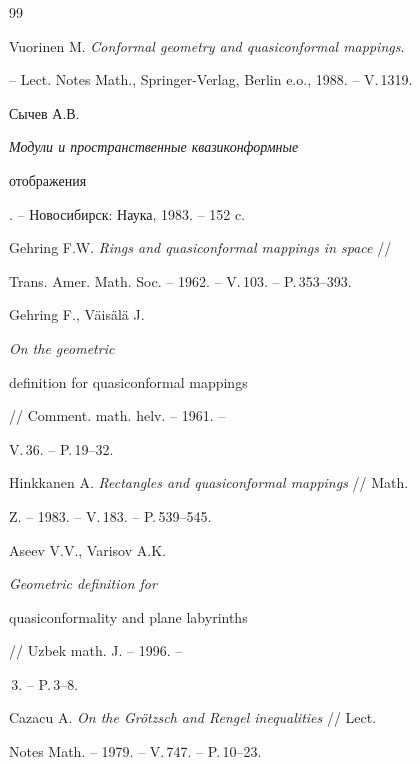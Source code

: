 \begin{thebibliography}{99}




Vuorinen M. {\em Conformal geometry and quasiconformal mappings}. 


-- Lect. Notes Math., Springer-Verlag, Berlin e.o., 1988. -- V.\,1319.







Сычев А.В. {\em Модули и пространственные квазиконформные 


отображения}. -- Новосибирск: Наука, 1983. -- 152 c.







Gehring F.W. {\em Rings and quasiconformal mappings in space} //


Trans. Amer. Math. Soc. -- 1962. -- V.\,103. -- P.\,353--393.







Gehring F., V\"{a}is\"{a}l\"{a} J. {\em On the geometric 


definition for quasiconformal mappings} // Comment. math. helv. -- 1961. --


V.\,36. -- P.\,19--32.







Hinkkanen A. {\em Rectangles and quasiconformal mappings} // Math. 


Z. -- 1983. -- V.\,183. -- P.\,539--545.







Aseev V.V., Varisov A.K. {\em Geometric definition for 


quasiconformality and plane labyrinths} // Uzbek math. J. -- 1996. --


\No\,3. -- P.\,3--8.







Cazacu A. {\em On the Gr\"{o}tzsch and Rengel inequalities} // Lect. 


Notes Math. -- 1979. -- V.\,747. -- P.\,10--23.






\end{thebibliography}
